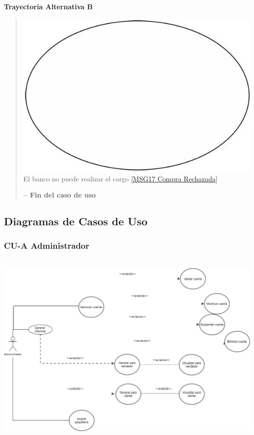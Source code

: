 \documentclass[14pt]{article}
\begin{document}
                \vspace{0.5cm}\textbf{Trayectoria Alternativa B}\label{CU-1.11 Trayectoria Alternativa B}
                    \begin{quote}
                        \begin{enumerate} \includegraphics[height=0.02\textwidth]{Sistema.jpg}
                            \label{Sistema} El banco no puede realizar el cargo \ref{MSG17 Compra Rechazada}
                        
                        \vspace{0.3cm}\textbf{-- Fin del caso de uso}
                        \end{enumerate}
                    \end{quote}
        \newpage
        \subsection{Diagramas de Casos de Uso}
            \vspace{1cm}
            \subsubsection{CU-A Administrador}\
            \vspace{1cm}
            \includegraphics[height=0.65\textwidth]{CasoDeUsoAdministrador.jpg}
            \label{fig:CasoDeUsoAdministrador}
                
            \newpage
                
\end{document}
